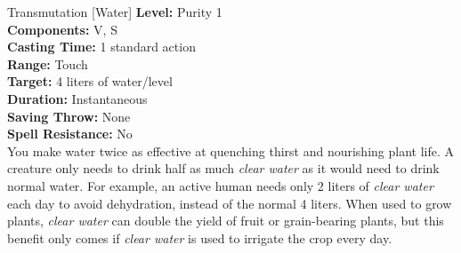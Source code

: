 {Transmutation [Water]}
{
	\textbf{Level:}
	Purity 1\\
	\textbf{Components:}
	V, S\\
	\textbf{Casting Time:}
	1 standard action\\
	\textbf{Range:}
	Touch\\
	\textbf{Target:}
	4 liters of water/level\\
	\textbf{Duration:}
	Instantaneous\\
	\textbf{Saving Throw:}
	None\\
	\textbf{Spell Resistance:}
	No\\
}
{
	You make water twice as effective at quenching thirst and nourishing plant life. A creature only needs to drink half as much \emph{clear water} as it would need to drink normal water. For example, an active human needs only 2 liters of \emph{clear water} each day to avoid dehydration, instead of the normal 4 liters. When used to grow plants, \emph{clear water} can double the yield of fruit or grain-bearing plants, but this benefit only comes if \emph{clear water} is used to irrigate the crop every day.
}
